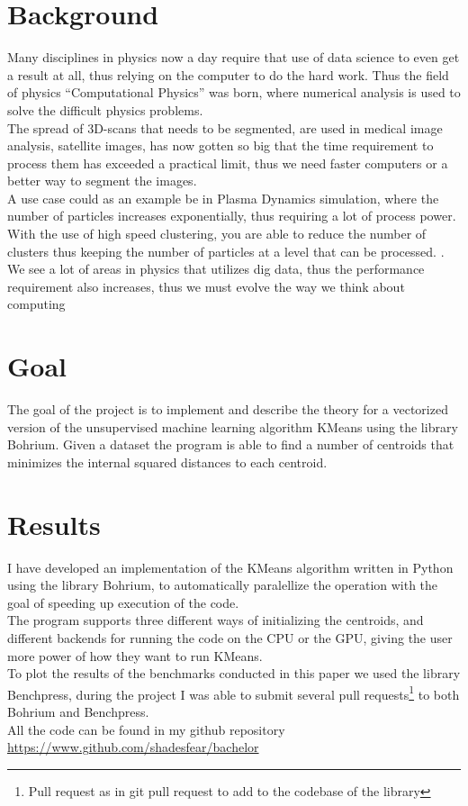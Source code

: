 \documentclass[12pt]{report}
\begin{document}
\section{Background}
\label{subsec:background}
Many disciplines in physics now a day require that use of data science to even get a result at all, thus relying on the computer to do the hard work. Thus the field of physics ``Computational Physics'' was born, where numerical analysis is used to solve the difficult physics problems. \\
The spread of 3D-scans that needs to be segmented, are used in medical image analysis, satellite images, has now gotten so big that the time requirement to process them has exceeded a practical limit, thus we need faster computers or a better way to segment the images. \\
A use case could as an example be in Plasma Dynamics simulation, where the number of particles increases exponentially, thus requiring a lot of process power. With the use of  high speed clustering, you are able to reduce the number of clusters thus keeping the number of particles at a level that can be processed. \cite{lucas}.\\
We see a lot of areas in physics that utilizes dig data, thus the performance requirement also increases, thus we must evolve the way we think about computing

\section{Goal}
\label{subsec:goal}
The goal of the project is to implement and describe the theory for a vectorized version of the unsupervised machine learning algorithm KMeans using the library Bohrium. Given a dataset the program is able to find a number of centroids that minimizes the internal squared distances to each centroid.
\section{Results}
\label{sec:intro_results}
I have developed an implementation of the KMeans algorithm written in Python using the library Bohrium, to automatically paralellize the operation with the goal of speeding up execution of the code. \\
The program supports three different ways of initializing the centroids, and different backends for running the code on the CPU or the GPU, giving the user more power of how they want to run KMeans.\\ To plot the results of the benchmarks conducted in this paper we used the library Benchpress, during the project I was able to submit several pull requests\footnote{Pull request as in git pull request to add to the codebase of the library} to both Bohrium and Benchpress. \\
All the code can be found in my github repository \href{https://www.github.com/shadesfear/bachelor}{https://www.github.com/shadesfear/bachelor}
\end{document}
